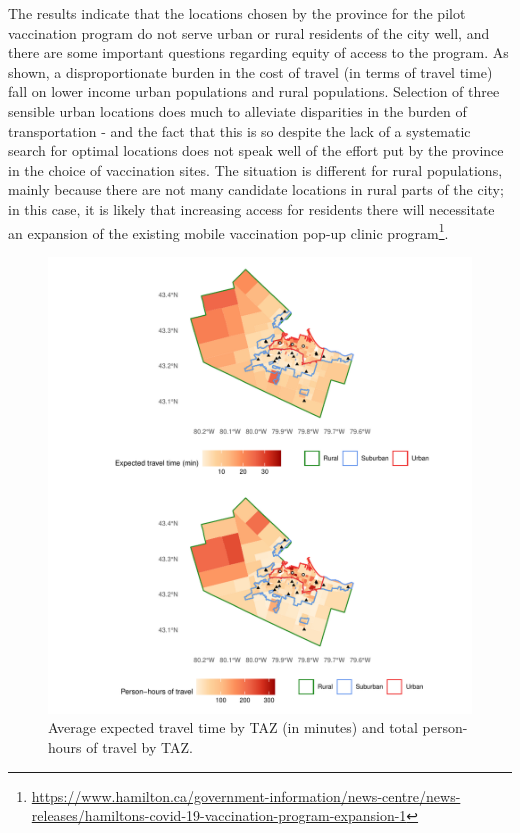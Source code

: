 \documentclass[]{elsarticle} %
\begin{document}
The results indicate that the locations chosen by the province for the
pilot vaccination program do not serve urban or rural residents of the
city well, and there are some important questions regarding equity of
access to the program. As shown, a disproportionate burden in the cost
of travel (in terms of travel time) fall on lower income urban
populations and rural populations. Selection of three sensible urban
locations does much to alleviate disparities in the burden of
transportation - and the fact that this is so despite the lack of a
systematic search for optimal locations does not speak well of the
effort put by the province in the choice of vaccination sites. The
situation is different for rural populations, mainly because there are
not many candidate locations in rural parts of the city; in this case,
it is likely that increasing access for residents there will necessitate
an expansion of the existing mobile vaccination pop-up clinic
program\footnote{\url{https://www.hamilton.ca/government-information/news-centre/news-releases/hamiltons-covid-19-vaccination-program-expansion-1}}.

\begin{figure}

{\centering \includegraphics{Accessibility-Vaccination-Sites-Hamilton_files/figure-latex/figure-maps-baseline-1} 

}

\caption{\label{fig:maps-baseline}Average expected travel time by TAZ (in minutes) and total person-hours of travel by TAZ.}\label{fig:figure-maps-baseline}
\end{figure}
\end{document}
